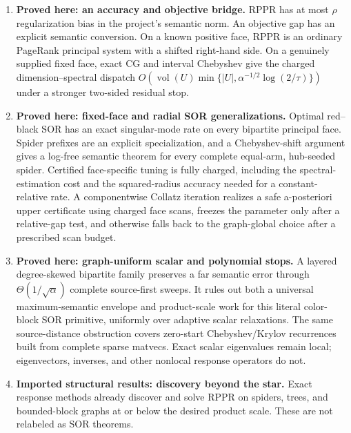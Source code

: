 \begin{enumerate}[leftmargin=*]
\item \textbf{Proved here: an accuracy and objective bridge.}  RPPR has at
      most $\rho$ regularization bias in the project's semantic norm.  An
      objective gap has an explicit semantic conversion.  On a known positive
      face, RPPR is an ordinary PageRank principal system with a shifted
      right-hand side.  On a genuinely supplied fixed face, exact CG and
      interval Chebyshev give the charged dimension--spectral dispatch
      $O(\operatorname{vol}(U)\min\{|U|,
      \alpha^{-1/2}\log(2/\tau)\})$ under a stronger two-sided residual stop.
\item \textbf{Proved here: fixed-face and radial SOR generalizations.}  Optimal
      red--black SOR has an exact singular-mode rate on every bipartite
      principal face.  Spider prefixes are an explicit specialization, and a
      Chebyshev-shift argument gives a log-free semantic theorem for every
      complete equal-arm, hub-seeded spider.  Certified face-specific tuning
      is fully charged, including the spectral-estimation cost and the
      squared-radius accuracy needed for a constant-relative rate.  A
      componentwise Collatz iteration realizes a safe a-posteriori upper
      certificate using charged face scans, freezes the parameter only after
      a relative-gap test, and otherwise falls back to the graph-global
      choice after a prescribed scan budget.
\item \textbf{Proved here: graph-uniform scalar and polynomial stops.}  A layered
      degree-skewed bipartite family preserves a far semantic error through
      $\Theta(1/\sqrt\alpha)$ complete source-first sweeps.  It rules out both
      a universal maximum-semantic envelope and product-scale work for this
      literal color-block SOR primitive, uniformly over adaptive scalar
      relaxations.  The same source-distance obstruction covers zero-start
      Chebyshev/Krylov recurrences built from complete sparse matvecs.  Exact
      scalar eigenvalues remain local; eigenvectors, inverses, and other
      nonlocal response operators do not.
\item \textbf{Imported structural results: discovery beyond the star.}
      Exact response methods already discover and solve RPPR on spiders,
      trees, and bounded-block graphs at or below the desired product scale.
      These are not relabeled as SOR theorems.
\end{enumerate}

